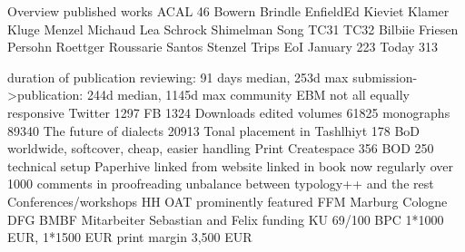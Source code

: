 Overview
  published works
    ACAL 46
    Bowern
    Brindle
    EnfieldEd
    Kieviet
    Klamer
    Kluge
    Menzel
    Michaud
    Lea
    Schrock
    Shimelman
    Song
    TC31
    TC32
    Bilbiie
    Friesen
    Persohn
    Roettger
    Roussarie
    Santos
    Stenzel
    Trips
  EoI
    January 223
    Today 313  
    
  duration of publication 
    reviewing: 91 days median, 253d max
    submission->publication: 244d median, 1145d max
  community
    EBM
      not all equally responsive
  Twitter
    1297
  FB
    1324
  Downloads
    edited volumes 61825
    monographs 89340
    The future of dialects 20913
    Tonal placement in Tashlhiyt 178
    BoD
      worldwide, softcover, cheap, easier handling
  Print 
    Createspace 356
    BOD 250 
  technical setup
    Paperhive 
      linked from website
      linked in book
      now regularly over 1000 comments in proofreading
      unbalance between typology++ and the rest
  Conferences/workshops
    HH
    OAT
      prominently featured
    FFM
    Marburg
    Cologne
    DFG
    BMBF
  Mitarbeiter
    Sebastian and Felix
  funding
    KU
      69/100
    BPC 
      1*1000 EUR, 1*1500 EUR
    print margin
      3,500 EUR

    